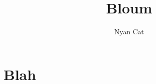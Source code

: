 \documentclass{article}
\author{Nyan Cat}
\title{Bloum}
\begin{document}
\maketitle

\section{Blah}
\end{document}
